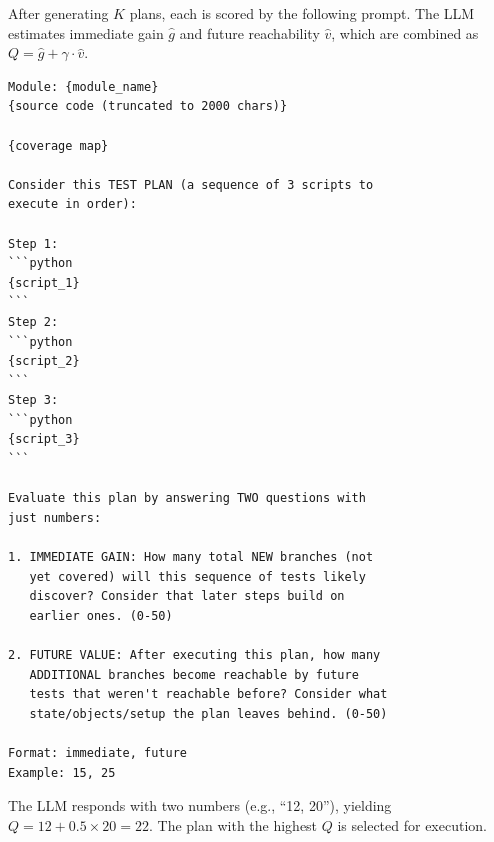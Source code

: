 After generating $K$ plans, each is scored by the following prompt. The LLM estimates immediate gain $\hat{g}$ and future reachability $\hat{v}$, which are combined as $Q = \hat{g} + \gamma \cdot \hat{v}$.

\begin{tcolorbox}[colback=green!3!white, colframe=green!30!black, title=Q-Value Scoring Prompt, fonttitle=\bfseries\small]
\begin{small}
\begin{verbatim}
Module: {module_name}
{source code (truncated to 2000 chars)}

{coverage map}

Consider this TEST PLAN (a sequence of 3 scripts to
execute in order):

Step 1:
```python
{script_1}
```
Step 2:
```python
{script_2}
```
Step 3:
```python
{script_3}
```

Evaluate this plan by answering TWO questions with
just numbers:

1. IMMEDIATE GAIN: How many total NEW branches (not
   yet covered) will this sequence of tests likely
   discover? Consider that later steps build on
   earlier ones. (0-50)

2. FUTURE VALUE: After executing this plan, how many
   ADDITIONAL branches become reachable by future
   tests that weren't reachable before? Consider what
   state/objects/setup the plan leaves behind. (0-50)

Format: immediate, future
Example: 15, 25
\end{verbatim}
\end{small}
\end{tcolorbox}

\noindent The LLM responds with two numbers (e.g., ``12, 20''), yielding $Q = 12 + 0.5 \times 20 = 22$. The plan with the highest $Q$ is selected for execution.
